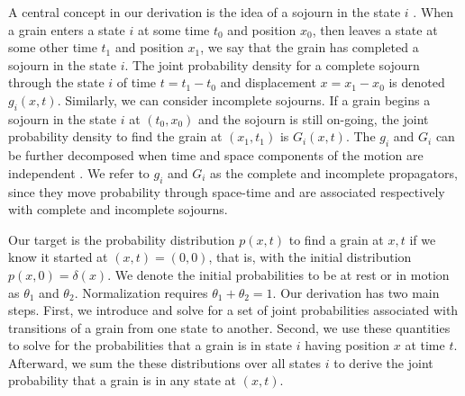 \documentclass[]{agujournal2018}
\begin{document}
A central concept in our derivation is the idea of a sojourn in the state $i$ \citep{Weiss1994}.
When a grain enters a state $i$ at some time $t_0$ and position $x_0$, then leaves a state at some other time $t_1$ and position $x_1$, we say that the grain has completed a sojourn in the state $i$. The joint probability density for a complete sojourn through the state $i$ of time $t = t_1-t_0$ and displacement $x = x_1-x_0$ is denoted $g_i(x,t).$ Similarly, we can consider incomplete sojourns. If a grain begins a sojourn in the state $i$ at $(t_0,x_0)$ and the sojourn is still on-going, the joint probability density to find the grain at $(x_1,t_1)$ is $G_i(x,t)$. The $g_i$ and $G_i$ can be further decomposed when time and space components of the motion are independent \citep{Weiss1994}.
We refer to $g_i$ and $G_i$ as the complete and incomplete propagators, since they move probability through space-time and are associated respectively with complete and incomplete sojourns.

Our target is the probability distribution $p(x,t)$ to find a grain at $x,t$ if we know it started at $(x,t)=(0,0)$, that is, with the initial distribution $p(x,0)=\delta(x)$.
We denote the initial probabilities to be at rest or in motion as $\theta_1$ and $\theta_2$. 
Normalization requires $\theta_1+\theta_2=1$.
Our derivation has two main steps.
First, we introduce and solve for a set of joint probabilities associated with transitions of a grain from one state to another.
Second, we use these quantities to solve for the probabilities that a grain is in state $i$ having position $x$ at time $t$.
Afterward, we sum the these distributions over all states $i$ to derive the joint probability that a grain is in any state at $(x,t)$.
\end{document}

